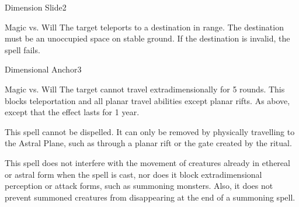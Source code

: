 \begin{spellsection}{Dimension Slide}{2}
\begin{spellheader}
\end{spellheader}
\begin{spellcontent}
    \begin{spelltargetinginfo}
    \end{spelltargetinginfo}
    \begin{spelleffects}
        \begin{spellattack}{Magic vs. Will}
            \spelleffect The target teleports to a destination in range. The destination must be an unoccupied space on stable ground. If the destination is invalid, the spell fails.
        \end{spellattack}
    \end{spelleffects}
\end{spellcontent}
\begin{spellfooter}
\end{spellfooter}
\end{spellsection}

\begin{spellsection}{Dimensional Anchor}{3}
\begin{spellheader}
\end{spellheader}
\begin{spellcontent}
    \begin{spelltargetinginfo}
    \end{spelltargetinginfo}
    \begin{spelleffects}
        \begin{spellattack}{Magic vs. Will}
            \spellsuccess  The target cannot travel extradimensionally for 5 rounds. This blocks teleportation and all planar travel abilities except planar rifts.
            \spellcritical As above, except that the effect lasts for 1 year.
        \end{spellattack}
    \end{spelleffects}
\end{spellcontent}
\begin{spellfooter}
    \spellnotes This spell cannot be dispelled. It can only be removed by physically travelling to the Astral Plane, such as through a planar rift or the gate created by the  ritual.
    
    This spell does not interfere with the movement of creatures already in ethereal or astral form when the spell is cast, nor does it block extradimensional perception or attack forms, such as summoning monsters. Also, it does not prevent summoned creatures from disappearing at the end of a summoning spell.
\end{spellfooter}
\end{spellsection}

